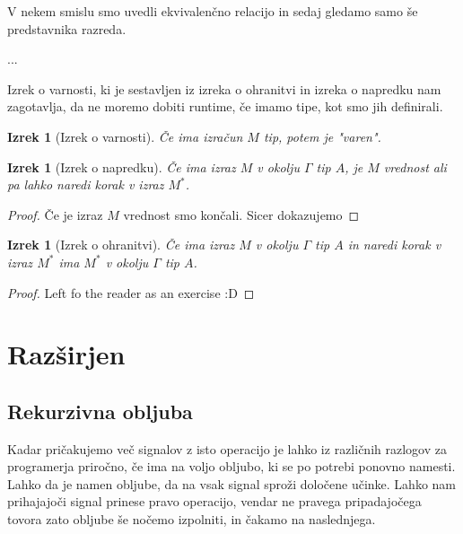 \documentclass[12pt,a4paper,twoside]{article}
\newcommand\mP[1]{\todo[inline,color=red]{#1 -MP}}	%
\theoremstyle{definition} %
\theoremstyle{plain} %
\newtheorem{izrek}[definicija]{Izrek}
\numberwithin{equation}{section}  %
\begin{document}
V nekem smislu smo uvedli ekvivalenčno relacijo in sedaj gledamo samo še predstavnika razreda.
 

...

Izrek o varnosti, ki je sestavljen iz izreka o ohranitvi in izreka o napredku nam zagotavlja, da ne moremo dobiti runtime, če imamo tipe, kot smo jih definirali.

\begin{izrek}[Izrek o varnosti]
	Če ima izračun $M$ tip, potem je "varen".
\end{izrek}


\begin{izrek}[Izrek o napredku]
	Če ima izraz $M$ v okolju $\Gamma$ tip $A$, je $M$ vrednost ali pa lahko naredi korak v izraz $M^*$.
\end{izrek}

\begin{proof}
	Če je izraz $M$ vrednost smo končali. Sicer dokazujemo 
\end{proof}


\begin{izrek}[Izrek o ohranitvi]
	Če ima izraz $M$ v okolju $\Gamma$ tip $A$ in naredi korak v izraz $M^*$ ima $M^*$ v okolju $\Gamma$ tip $A$.
\end{izrek}

\begin{proof}
	Left fo the reader as an exercise :D
\end{proof}


\section{Razširjen \lae{}}\label{sec:razsirjen-lae}



\subsection{Rekurzivna obljuba}


\mP{Tole še ni za oddati.}

Kadar pričakujemo več signalov z isto operacijo je lahko iz različnih razlogov za programerja priročno, če ima na voljo obljubo, ki se po potrebi ponovno namesti. Lahko da je namen obljube, da na vsak signal sproži določene učinke. Lahko nam prihajajoči signal prinese pravo operacijo, vendar ne pravega pripadajočega tovora zato obljube še nočemo izpolniti, in čakamo na naslednjega.
\end{document}
